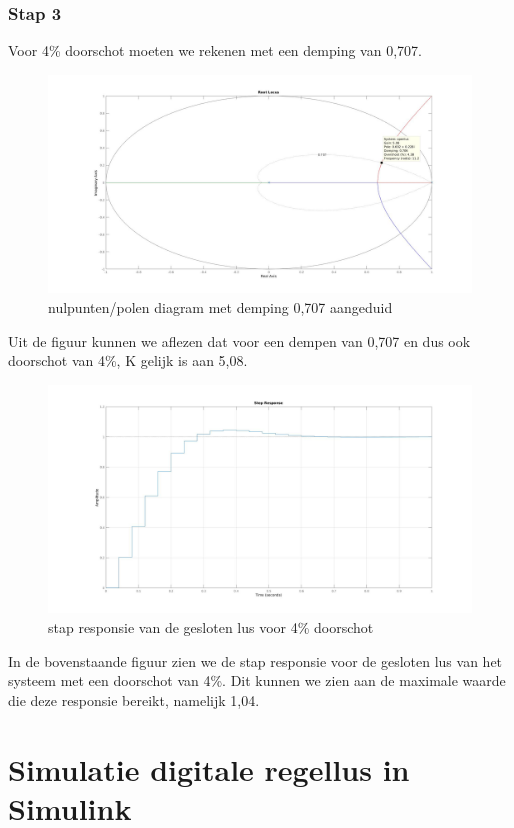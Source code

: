\documentclass[a4paper, 12pt]{article}
\begin{document}
\subsubsection{Stap 3}

Voor 4\% doorschot moeten we rekenen met een demping van 0,707.

\begin{figure}[!h]
	\includegraphics[width=0.9\linewidth]{Labo3_4_rootlocus4.jpg}
	\caption{nulpunten/polen diagram met demping 0,707 aangeduid}
\end{figure}

Uit de figuur kunnen we aflezen dat voor een dempen van 0,707 en dus ook doorschot van 4\%, K gelijk is aan 5,08.

\begin{figure}[!h]
	\includegraphics[width=1\linewidth]{Labo3_4_step_response4.jpg}
	\caption{stap responsie van de gesloten lus voor 4\% doorschot}
\end{figure}

In de bovenstaande figuur zien we de stap responsie voor de gesloten lus van het systeem met een doorschot van 4\%. Dit kunnen we zien aan de maximale waarde die deze responsie bereikt, namelijk 1,04.

\section{Simulatie digitale regellus in Simulink}
\end{document}
